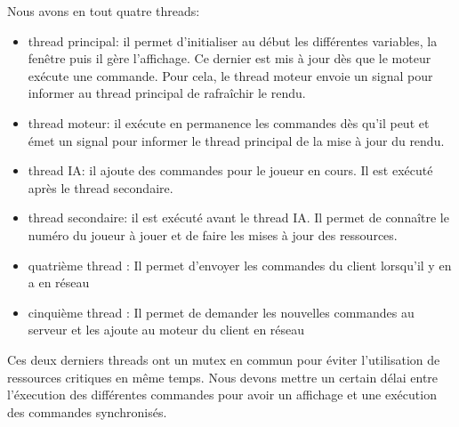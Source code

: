 \documentclass[12pt,a4paper]{article}
\begin{document}
Nous avons en tout quatre threads: 
\begin{itemize}
    \item thread principal: il permet d'initialiser au début les différentes variables, la fenêtre puis il gère l'affichage. Ce dernier est mis à jour dès que le moteur exécute une commande. Pour cela, le thread moteur envoie un signal pour informer au thread principal de rafraîchir le rendu.
    \item thread moteur: il exécute en permanence les commandes dès qu'il peut et émet un signal pour informer le thread principal de la mise à jour du rendu. 
    \item thread IA: il ajoute des commandes pour le joueur en cours. Il est exécuté après le thread secondaire.
    \item thread secondaire: il est exécuté avant le thread IA. Il permet de connaître le numéro du joueur à jouer et de faire les mises à jour des ressources.
    \item quatrième thread : Il permet d'envoyer les commandes du client lorsqu'il y en a en réseau
    \item cinquième thread : Il permet de demander les nouvelles commandes au serveur et les ajoute au moteur du client en réseau
\end{itemize}
Ces deux derniers threads ont un mutex en commun pour éviter l'utilisation de ressources critiques en même temps.
Nous devons mettre un certain délai entre l'éxecution des différentes commandes pour avoir un affichage et une exécution des commandes synchronisés.
\end{document}
